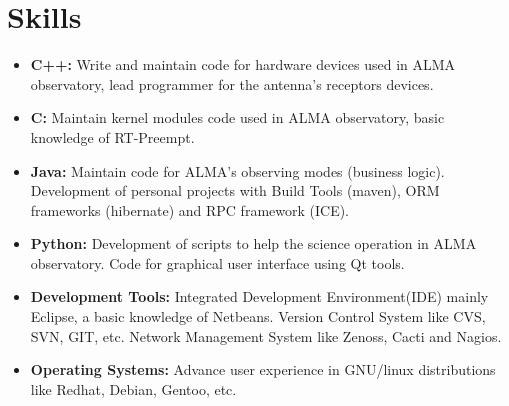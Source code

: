 \documentclass[letterpaper,11pt]{article}
\newcommand{\resumeItem}[1]{
  \item\small{
    {#1 \vspace{-2pt}}
  }
}
\newcommand{\skillItem}[2]{
  \item\small{
    \textbf{#1:}{ #2 \vspace{-2pt}}
  }
}
\newcommand{\resumeSubItem}[2]{\resumeItem{#1}\vspace{-4pt}}
\newcommand{\resumeSubHeadingListStart}{\begin{itemize}[leftmargin=*]}
\newcommand{\resumeSubHeadingListEnd}{\end{itemize}}
\begin{document}
\section{Skills}
  \resumeSubHeadingListStart
    \skillItem{C++}
    {Write and maintain code for hardware devices used in ALMA observatory, lead programmer for the antenna's receptors devices.}
    \skillItem{C}{Maintain kernel modules code used in ALMA observatory, basic knowledge of RT-Preempt.}
    \skillItem{Java}{Maintain code for ALMA's observing modes (business logic). Development of personal projects with Build Tools (maven), ORM frameworks (hibernate) and RPC framework (ICE).}
    \skillItem{Python}{Development of scripts to help the science operation in ALMA observatory. Code for graphical user interface using Qt tools.}
    \skillItem{Development Tools}{Integrated Development Environment(IDE) mainly Eclipse, a basic knowledge of Netbeans. Version Control System like CVS, SVN, GIT, etc. Network Management System like Zenoss, Cacti and Nagios.}
    \skillItem{Operating Systems}{Advance user experience in GNU/linux distributions like Redhat, Debian, Gentoo, etc.}
  \resumeSubHeadingListEnd



\end{document}
